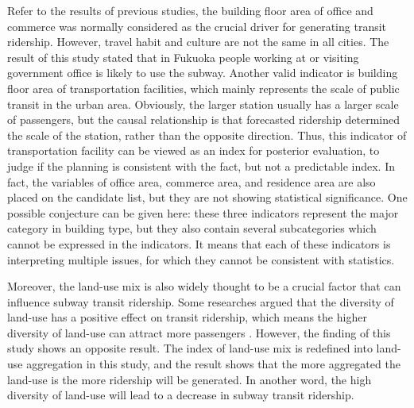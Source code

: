 %
Refer to the results of previous studies, the building floor area of office and commerce was normally considered as the crucial driver for generating transit ridership. However, travel habit and culture are not the same in all cities. The result of this study stated that in Fukuoka people working at or visiting government office is likely to use the subway. Another valid indicator is building floor area of transportation facilities, which mainly represents the scale of public transit in the urban area. Obviously, the larger station usually has a larger scale of passengers, but the causal relationship is that forecasted ridership determined the scale of the station, rather than the opposite direction. Thus, this indicator of transportation facility can be viewed as an index for posterior evaluation, to judge if the planning is consistent with the fact, but not a predictable index. In fact, the variables of office area, commerce area, and residence area are also placed on the candidate list, but they are not showing statistical significance. One possible conjecture can be given here: these three indicators represent the major category in building type, but they also contain several subcategories which cannot be expressed in the indicators. It means that each of these indicators is interpreting multiple issues, for which they cannot be consistent with statistics.

%
Moreover, the land-use mix is also widely thought to be a crucial factor that can influence subway transit ridership. Some researches argued that the diversity of land-use has a positive effect on transit ridership, which means the higher diversity of land-use can attract more passengers \cite{gutierrez2011transit,jun2015land}. However, the finding of this study shows an opposite result. The index of land-use mix is redefined into land-use aggregation in this study, and the result shows that the more aggregated the land-use is the more ridership will be generated. In another word, the high diversity of land-use will lead to a decrease in subway transit ridership. 


